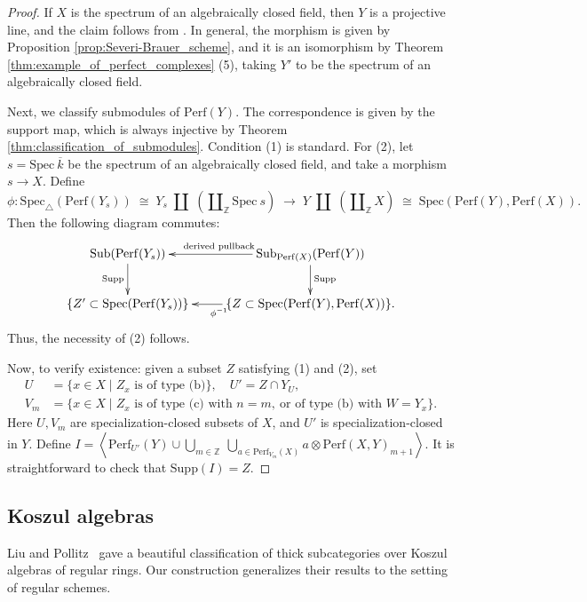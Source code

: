 \documentclass[11pt]{amsart}
\theoremstyle{definition}
\theoremstyle{plain}
\theoremstyle{remark}
\newcommand{\perf}{\mathrm{Perf}}
\newcommand{\Spec}{\mathrm{Spec}}
\newcommand{\Sub}{\mathrm{Sub}}
\newcommand{\tSpec}{\mathrm{Spec}_{\triangle}}
\newcommand{\Supp}{\mathrm{Supp}}
\newcommand{\ang}[1]{{\left\langle{#1}\right\rangle}}
\numberwithin{equation}{section}
\begin{document}
\begin{proof}
If \(X\) is the spectrum of an algebraically closed field, then \(Y\) is a projective line, and the claim follows from \cite{KS}.
In general, the morphism is given by Proposition \ref{prop:Severi-Brauer_scheme}, and it is an isomorphism by Theorem \ref{thm:example_of_perfect_complexes} (5), taking \(Y'\) to be the spectrum of an algebraically closed field.

Next, we classify submodules of \(\perf(Y)\).
The correspondence is given by the support map, which is always injective by Theorem \ref{thm:classification_of_submodules}.
Condition (1) is standard.
For (2), let \(s = \Spec~ \overline{k}\) be the spectrum of an algebraically closed field, and take a morphism \(s \to X\).
Define
\[
\phi:\tSpec(\perf(Y_{s}))\;\cong\; Y_{s}\;\amalg\;\left(\amalg_\mathbb{Z} \Spec\ s\right)\;\longrightarrow\; Y\;\amalg\;\left(\amalg_{\mathbb{Z}}X\right)\;\cong\;\Spec(\perf(Y),\perf(X)).
\]
Then the following diagram commutes:
\[
\xymatrix{
\Sub(\perf(Y_{s}))\ar[d]_{\Supp}&\Sub_{\perf(X)}(\perf(Y))\ar[l]_{\text{derived pullback}}\ar[d]^{\Supp}\\
\{Z'\subset \Spec(\perf(Y_{s}))\}& \ar[l]^{\phi^{-1}}\{Z\subset \Spec(\perf(Y),\perf(X))\}.}
\]
Thus, the necessity of (2) follows.

Now, to verify existence: given a subset \(Z\) satisfying (1) and (2), set
\begin{align*}
U&=\{x\in X\mid Z_x \text{ is of type (b)}\},\quad
U'=Z\cap Y_U,\\
V_m&=\{x\in X\mid Z_x \text{ is of type (c) with }n=m,\ \text{or of type (b) with }W=Y_x\}.
\end{align*}
Here \(U,V_m\) are specialization-closed subsets of \(X\), and \(U'\) is specialization-closed in \(Y\).
Define \(I=\ang{\perf_{U'}(Y)\cup \bigcup_{m\in\mathbb{Z}}\ \bigcup_{a\in\perf_{V_m}(X)} a\otimes\perf(X,Y)_{m+1}}\).
It is straightforward to check that \(\Supp(I)=Z\).
\end{proof}

\subsection{Koszul algebras}\label{subsec:Koszul_algebras}

Liu and Pollitz~\cite{liu2025classifying} gave a beautiful classification of thick subcategories over Koszul algebras of regular rings.  
Our construction generalizes their results to the setting of regular schemes.
\end{document}
